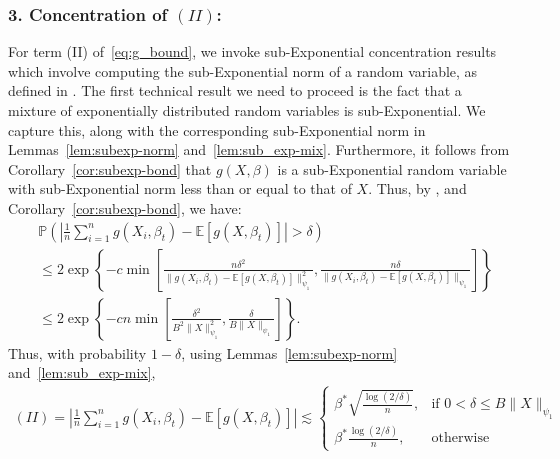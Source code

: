 \documentclass[runningheads]{llncs}
\begin{document}
\begin{subappendices}
        \subsubsection{3.  Concentration of $(II)$:}
For term (II) of~\eqref{eq:g_bound}, we invoke sub-Exponential concentration
results which involve computing the sub-Exponential norm of a random variable,
as defined in \cite[Definition 2.8.4]{vershynin2020high}.
The first technical result we need to proceed is the fact that a mixture of
exponentially distributed random variables is sub-Exponential. We capture this,
along with the corresponding sub-Exponential norm in
Lemmas~\ref{lem:subexp-norm} and~\ref{lem:sub_exp-mix}.
Furthermore, it follows from Corollary~\ref{cor:subexp-bond} that $g(X,\beta)$ is a
sub-Exponential random variable with sub-Exponential norm less than or equal to
that of $X$. Thus, by \cite[Theorem
2.9.1]{vershynin2020high}, \cite[Lemma 2.7.8]{vershynin2020high} and
Corollary~\ref{cor:subexp-bond}, we have:
\begin{align}
  \label{eq:prob_rate}
  & \mathbb{P}\left( \left| \frac{1}{n} \sum_{i=1}^n g(X_i, \beta_t)- \mathbb{E}[g(X,\beta_t)] \right|  > \delta \right)
    \nonumber
  \\
  &\leq
    2 \exp \left\{-c \min \left[\frac{n \delta^2}
    {\|g(X_i, \beta_t)- \mathbb{E}[g(X,\beta_t)]\|_{\psi_1}^2},
    \frac{n\delta}{\|g(X_i, \beta_t)- \mathbb{E}[g(X,\beta_t)]\|_{\psi_1}}\right] \right\}
    \nonumber \\
  &
    \leq
    2 \exp \left\{-cn  \min \left[\frac{\delta^2}{B^2 \|X\|_{\psi_1}^2},
    \frac{\delta}{B\|X\|_{\psi_1}}\right] \right\}.
\end{align}
Thus, with probability $1-\delta$, using Lemmas~\ref{lem:subexp-norm} and~\ref{lem:sub_exp-mix},
\begin{align*}
  (II)=
  \left| \frac{1}{n} \sum_{i=1}^n g(X_i, \beta_t)- \mathbb{E}[g(X,\beta_t)] \right|
  \lesssim
  \begin{cases}
    \beta^*\sqrt{\frac{\log(2/ \delta)}{n}},&  \text{if } 0 < \delta \leq B\|X\|_{\psi_1}\\
    \beta^*\frac{\log(2/ \delta)}{n},  &           \text{otherwise}
  \end{cases}
\end{align*}



\end{subappendices}
\end{document}
